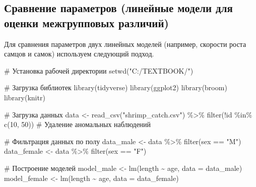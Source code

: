 \documentclass[
  letterpaper,
  DIV=11,
  numbers=noendperiod]{scrreprt}
\newenvironment{Shaded}{\begin{snugshade}}{\end{snugshade}}
\newcommand{\AttributeTok}[1]{\textcolor[rgb]{0.40,0.45,0.13}{#1}}
\newcommand{\CommentTok}[1]{\textcolor[rgb]{0.37,0.37,0.37}{#1}}
\newcommand{\DecValTok}[1]{\textcolor[rgb]{0.68,0.00,0.00}{#1}}
\newcommand{\FunctionTok}[1]{\textcolor[rgb]{0.28,0.35,0.67}{#1}}
\newcommand{\NormalTok}[1]{\textcolor[rgb]{0.00,0.23,0.31}{#1}}
\newcommand{\OtherTok}[1]{\textcolor[rgb]{0.00,0.23,0.31}{#1}}
\newcommand{\SpecialCharTok}[1]{\textcolor[rgb]{0.37,0.37,0.37}{#1}}
\newcommand{\StringTok}[1]{\textcolor[rgb]{0.13,0.47,0.30}{#1}}
\begin{document}
\subsection{Сравнение параметров (линейные модели для оценки
межгрупповых
различий)}\label{ux441ux440ux430ux432ux43dux435ux43dux438ux435-ux43fux430ux440ux430ux43cux435ux442ux440ux43eux432-ux43bux438ux43dux435ux439ux43dux44bux435-ux43cux43eux434ux435ux43bux438-ux434ux43bux44f-ux43eux446ux435ux43dux43aux438-ux43cux435ux436ux433ux440ux443ux43fux43fux43eux432ux44bux445-ux440ux430ux437ux43bux438ux447ux438ux439}

Для сравнения параметров двух линейных моделей (например, скорости роста
самцов и самок) используем следующий подход.

\begin{Shaded}
\begin{Highlighting}[]
\CommentTok{\# Установка рабочей директории}
\FunctionTok{setwd}\NormalTok{(}\StringTok{"C:/TEXTBOOK/"}\NormalTok{)}

\CommentTok{\# Загрузка библиотек}
\FunctionTok{library}\NormalTok{(tidyverse)}
\FunctionTok{library}\NormalTok{(ggplot2)}
\FunctionTok{library}\NormalTok{(broom)}
\FunctionTok{library}\NormalTok{(knitr)}

\CommentTok{\# Загрузка данных}
\NormalTok{data }\OtherTok{\textless{}{-}} \FunctionTok{read\_csv}\NormalTok{(}\StringTok{"shrimp\_catch.csv"}\NormalTok{) }\SpecialCharTok{\%\textgreater{}\%}
  \FunctionTok{filter}\NormalTok{(}\SpecialCharTok{!}\NormalTok{id }\SpecialCharTok{\%in\%} \FunctionTok{c}\NormalTok{(}\DecValTok{10}\NormalTok{, }\DecValTok{50}\NormalTok{))  }\CommentTok{\# Удаление аномальных наблюдений}

\CommentTok{\# Фильтрация данных по полу}
\NormalTok{data\_male }\OtherTok{\textless{}{-}}\NormalTok{ data }\SpecialCharTok{\%\textgreater{}\%} \FunctionTok{filter}\NormalTok{(sex }\SpecialCharTok{==} \StringTok{"M"}\NormalTok{)}
\NormalTok{data\_female }\OtherTok{\textless{}{-}}\NormalTok{ data }\SpecialCharTok{\%\textgreater{}\%} \FunctionTok{filter}\NormalTok{(sex }\SpecialCharTok{==} \StringTok{"F"}\NormalTok{)}

\CommentTok{\# Построение моделей}
\NormalTok{model\_male }\OtherTok{\textless{}{-}} \FunctionTok{lm}\NormalTok{(length }\SpecialCharTok{\textasciitilde{}}\NormalTok{ age, }\AttributeTok{data =}\NormalTok{ data\_male)}
\NormalTok{model\_female }\OtherTok{\textless{}{-}} \FunctionTok{lm}\NormalTok{(length }\SpecialCharTok{\textasciitilde{}}\NormalTok{ age, }\AttributeTok{data =}\NormalTok{ data\_female)}


\end{Highlighting}
\end{Shaded}
\end{document}
